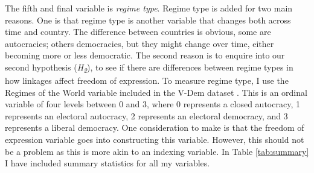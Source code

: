 The fifth and final variable is \textit{regime type}. Regime type is added for two main reasons. One is that regime type is another variable that changes both across time and country. The difference between countries is obvious, some are autocracies; others democracies, but they might change over time, either becoming more or less democratic. The second reason is to enquire into our second hypothesis (\textit{H\textsubscript{2}}), to see if there are differences between regime types in how linkages affect freedom of expression. To measure regime type, I use the Regimes of the World variable included in the V-Dem dataset \citep{coppedge_v-dem_2025}. This is an ordinal variable of four levels between 0 and 3, where 0 represents a closed autocracy, 1 represents an electoral autocracy, 2 represents an electoral democracy, and 3 represents a liberal democracy. One consideration to make is that the freedom of expression variable goes into constructing this variable. However, this should not be a problem as this is more akin to an indexing variable. In Table \ref{tab:summary} I have included summary statistics for all my variables.

